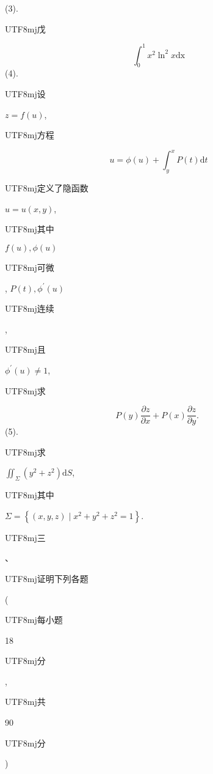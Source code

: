 \documentclass[10pt]{article}
\begin{document}
(3). \begin{CJK}{UTF8}{mj}戊\end{CJK}
$$
\int_{0}^{1} x^{2} \ln ^{2} x \mathrm{dx}
$$
(4). \begin{CJK}{UTF8}{mj}设\end{CJK} $z=f(u)$, \begin{CJK}{UTF8}{mj}方程\end{CJK}
$$
u=\phi(u)+\int_{y}^{x} P(t) \mathrm{d} t
$$
\begin{CJK}{UTF8}{mj}定义了隐函数\end{CJK} $u=u(x, y)$, \begin{CJK}{UTF8}{mj}其中\end{CJK} $f(u), \phi(u)$ \begin{CJK}{UTF8}{mj}可微\end{CJK}, $P(t), \phi^{\prime}(u)$ \begin{CJK}{UTF8}{mj}连续\end{CJK}, \begin{CJK}{UTF8}{mj}且\end{CJK} $\phi^{\prime}(u) \neq 1$, \begin{CJK}{UTF8}{mj}求\end{CJK}
$$
P(y) \frac{\partial z}{\partial x}+P(x) \frac{\partial z}{\partial y} \text {. }
$$
(5). \begin{CJK}{UTF8}{mj}求\end{CJK} $\iint_{\Sigma}\left(y^{2}+z^{2}\right) \mathrm{d} S$, \begin{CJK}{UTF8}{mj}其中\end{CJK} $\Sigma=\left\{(x, y, z) \mid x^{2}+y^{2}+z^{2}=1\right\}$.

\begin{CJK}{UTF8}{mj}三\end{CJK}、\begin{CJK}{UTF8}{mj}证明下列各题\end{CJK} (\begin{CJK}{UTF8}{mj}每小题\end{CJK} 18 \begin{CJK}{UTF8}{mj}分\end{CJK}, \begin{CJK}{UTF8}{mj}共\end{CJK} 90 \begin{CJK}{UTF8}{mj}分\end{CJK})
\end{document}

